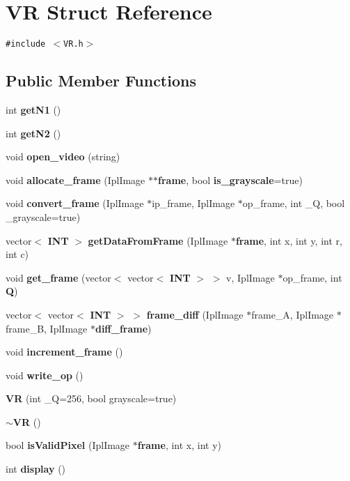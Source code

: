 \section{VR Struct Reference}
\label{structVR}
{\tt \#include $<$VR.h$>$}

\subsection*{Public Member Functions}
\begin{CompactItemize}
\item 
int {\bf getN1} ()
\item 
int {\bf getN2} ()
\item 
void {\bf open\_\-video} (string)
\item 
void {\bf allocate\_\-frame} (IplImage $\ast$$\ast${\bf frame}, bool {\bf is\_\-grayscale}=true)
\item 
void {\bf convert\_\-frame} (IplImage $\ast$ip\_\-frame, IplImage $\ast$op\_\-frame, int \_\-Q, bool \_\-grayscale=true)
\item 
vector$<$ {\bf INT} $>$ {\bf getDataFromFrame} (IplImage $\ast${\bf frame}, int x, int y, int r, int c)
\item 
void {\bf get\_\-frame} (vector$<$ vector$<$ {\bf INT} $>$ $>$ v, IplImage $\ast$op\_\-frame, int {\bf Q})
\item 
vector$<$ vector$<$ {\bf INT} $>$ $>$ {\bf frame\_\-diff} (IplImage $\ast$frame\_\-A, IplImage $\ast$frame\_\-B, IplImage $\ast${\bf diff\_\-frame})
\item 
void {\bf increment\_\-frame} ()
\item 
void {\bf write\_\-op} ()
\item 
{\bf VR} (int \_\-Q=256, bool grayscale=true)
\item 
{\bf $\sim$VR} ()
\item 
bool {\bf isValidPixel} (IplImage $\ast${\bf frame}, int x, int y)
\item 
int {\bf display} ()
\end{CompactItemize}
